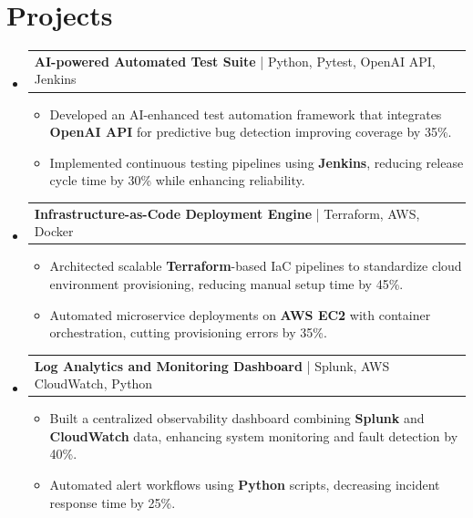 \documentclass[letterpaper,11pt]{article}
\makeatletter
\newcommand{\resumeItem}[1]{
  \item\footnotesize{
    {#1 \vspace{-2pt}}
  }
}
\newcommand{\resumeProjectHeading}[2]{
    \item
    \begin{tabular*}{1.001\textwidth}{l@{\extracolsep{\fill}}r}
      \small#1 & \textbf{\small #2}\\
    \end{tabular*}\vspace{-7pt}
}
\newcommand{\resumeSubHeadingListStart}{\begin{itemize}[leftmargin=0pt, label={}]}
\newcommand{\resumeSubHeadingListEnd}{\end{itemize}}
\newcommand{\resumeItemListStart}{\begin{itemize}[leftmargin=*]}
\newcommand{\resumeItemListEnd}{\end{itemize}\vspace{-5pt}}
\makeatother
\begin{document}
\section{Projects}
    \vspace{-5pt}
    \resumeSubHeadingListStart
          \resumeProjectHeading
              {\textbf{AI-powered Automated Test Suite} | Python, Pytest, OpenAI API, Jenkins}{}
        \resumeItemListStart
            \resumeItem{Developed an AI-enhanced test automation framework that integrates \textbf{OpenAI API} for predictive bug detection improving coverage by 35\%.}
            \resumeItem{Implemented continuous testing pipelines using \textbf{Jenkins}, reducing release cycle time by 30\% while enhancing reliability.}
        \resumeItemListEnd
        \vspace{-12pt}
    
    \resumeProjectHeading
        {\textbf{Infrastructure-as-Code Deployment Engine} | Terraform, AWS, Docker}{}
        \resumeItemListStart
            \resumeItem{Architected scalable \textbf{Terraform}-based IaC pipelines to standardize cloud environment provisioning, reducing manual setup time by 45\%.}
            \resumeItem{Automated microservice deployments on \textbf{AWS EC2} with container orchestration, cutting provisioning errors by 35\%.}
        \resumeItemListEnd
          \vspace{-12pt}
      \resumeProjectHeading
          {\textbf{Log Analytics and Monitoring Dashboard} | Splunk, AWS CloudWatch, Python}{}
          \resumeItemListStart
              \resumeItem{Built a centralized observability dashboard combining \textbf{Splunk} and \textbf{CloudWatch} data, enhancing system monitoring and fault detection by 40\%.}
              \resumeItem{Automated alert workflows using \textbf{Python} scripts, decreasing incident response time by 25\%.}
          \resumeItemListEnd 
    \resumeSubHeadingListEnd
\end{document}
